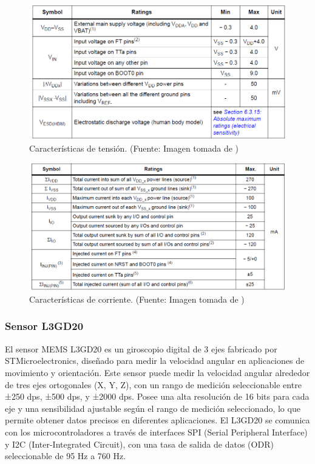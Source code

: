 \begin{figure}[H]
\centering
\includegraphics[scale=0.6]{./Figuras/Nota_teorica/ELEC1}
\caption{Características de tensión. (Fuente: Imagen tomada de \cite{ST})}
\label{fig:ELEC1}
\end{figure}

\begin{figure}[H]
\centering
\includegraphics[scale=0.6]{./Figuras/Nota_teorica/ELEC2}
\caption{Características de corriente. (Fuente: Imagen tomada de \cite{ST})}
\label{fig:ELEC2}
\end{figure}

\subsubsection{Sensor L3GD20}
El sensor MEMS L3GD20 es un giroscopio digital de 3 ejes fabricado por STMicroelectronics, diseñado para medir la velocidad angular en aplicaciones de movimiento y orientación. Este sensor puede medir la velocidad angular alrededor de tres ejes ortogonales (X, Y, Z), con un rango de medición seleccionable entre ±250 dps, ±500 dps, y ±2000 dps. Posee una alta resolución de 16 bits para cada eje y una sensibilidad ajustable según el rango de medición seleccionado, lo que permite obtener datos precisos en diferentes aplicaciones. El L3GD20 se comunica con los microcontroladores a través de interfaces SPI (Serial Peripheral Interface) y I2C (Inter-Integrated Circuit), con una tasa de salida de datos (ODR) seleccionable de 95 Hz a 760 Hz. \cite{L3} 

